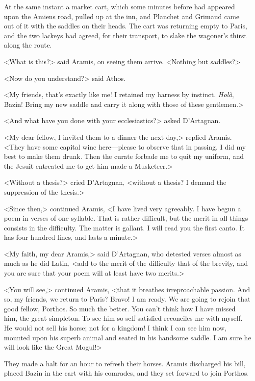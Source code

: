 At the same instant a market cart, which some minutes before had appeared upon the Amiens road, pulled up at the inn, and Planchet and Grimaud came out of it with the saddles on their heads. The cart was returning empty to Paris, and the two lackeys had agreed, for their transport, to slake the wagoner's thirst along the route. 

<What is this?> said Aramis, on seeing them arrive. <Nothing but saddles?> 

<Now do you understand?> said Athos. 

<My friends, that's exactly like me! I retained my harness by instinct. \textit{Holà}, Bazin! Bring my new saddle and carry it along with those of these gentlemen.> 

<And what have you done with your ecclesiastics?> asked D'Artagnan. 

<My dear fellow, I invited them to a dinner the next day,> replied Aramis. <They have some capital wine here—please to observe that in passing. I did my best to make them drunk. Then the curate forbade me to quit my uniform, and the Jesuit entreated me to get him made a Musketeer.> 

<Without a thesis?> cried D'Artagnan, <without a thesis? I demand the suppression of the thesis.> 

<Since then,> continued Aramis, <I have lived very agreeably. I have begun a poem in verses of one syllable. That is rather difficult, but the merit in all things consists in the difficulty. The matter is gallant. I will read you the first canto. It has four hundred lines, and lasts a minute.> 

<My faith, my dear Aramis,> said D'Artagnan, who detested verses almost as much as he did Latin, <add to the merit of the difficulty that of the brevity, and you are sure that your poem will at least have two merits.> 

<You will see,> continued Aramis, <that it breathes irreproachable passion. And so, my friends, we return to Paris? Bravo! I am ready. We are going to rejoin that good fellow, Porthos. So much the better. You can't think how I have missed him, the great simpleton. To see him so self-satisfied reconciles me with myself. He would not sell his horse; not for a kingdom! I think I can see him now, mounted upon his superb animal and seated in his handsome saddle. I am sure he will look like the Great Mogul!> 

They made a halt for an hour to refresh their horses. Aramis discharged his bill, placed Bazin in the cart with his comrades, and they set forward to join Porthos. 

